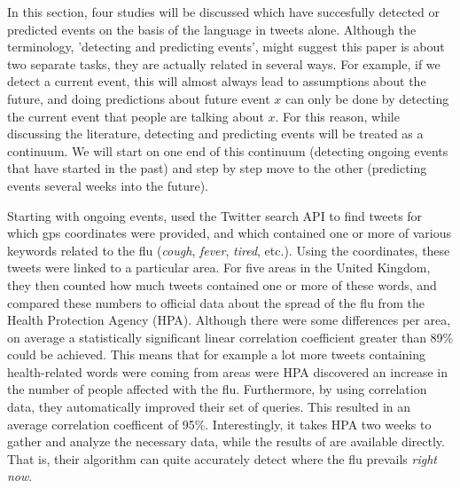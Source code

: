 \documentclass[12pt]{article}
\begin{document}
In this section, four studies will be discussed which have succesfully detected or predicted events on the basis of the language in tweets alone. Although the terminology, 'detecting and predicting events', might suggest this paper is about two separate tasks, they are actually related in several ways. For example, if we detect a current event, this will almost always lead to assumptions about the future, and doing predictions about future event $x$ can only be done by detecting the current event that people are talking about $x$. For this reason, while discussing the literature, detecting and predicting events will be treated as a continuum. We will start on one end of this continuum (detecting ongoing events that have started in the past) and step by step move to the other (predicting events several weeks into the future).

Starting with ongoing events,  used the Twitter search API to find tweets for which gps coordinates were provided, and which contained one or more of various keywords related to the flu (\emph{cough}, \emph{fever}, \emph{tired}, etc.). Using the coordinates, these tweets were linked to a particular area. For five areas in the United Kingdom, they then counted how much tweets contained one or more of these words, and compared these numbers to official data about the spread of the flu from the Health Protection Agency (HPA). Although there were some differences per area, on average a statistically significant linear correlation coefficient greater than 89\% could be achieved. This means that for example a lot more tweets containing health-related words were coming from areas were HPA discovered an increase in the number of people affected with the flu. Furthermore, by using correlation data, they automatically improved their set of queries. This resulted in an average correlation coefficent of 95\%.  Interestingly, it takes HPA two weeks to gather and analyze the necessary data, while the results of  are available directly. That is, their algorithm can quite accurately detect where the flu prevails \emph{right now}.
\end{document}
